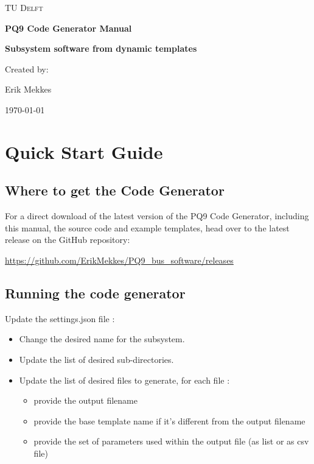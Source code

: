 \documentclass{settings/TU_Delft_Report}
\begin{document}
\begin{titlepage}
	\centering
	{\scshape\LARGE TU Delft \par}
	\vspace{1cm}
	{\huge\bfseries PQ9 Code Generator Manual\par}
	{\Large\bfseries Subsystem software from dynamic templates \par}

	\vfill  %
	{Created by: \par
	    Erik Mekkes}
	
	\vspace{0.3cm}
	
	{\large \today\par} %
\end{titlepage}

\tableofcontents


\chapter{Quick Start Guide}

\section{Where to get the Code Generator}
For a direct download of the latest version of the PQ9 Code Generator, including this manual, the source code and example templates, head over to the latest release on the GitHub repository:\vsp


\url{https://github.com/ErikMekkes/PQ9_bus_software/releases}

\section{Running the code generator}
Update the settings.json file :
\begin{itemize}
\item Change the desired name for the subsystem.
\item Update the list of desired sub-directories.
\item Update the list of desired files to generate, for each file :
\begin{itemize}
    \item provide the output filename
    \item provide the base template name if it's different from the output filename
    \item provide the set of parameters used within the output file (as list or as csv file)
\end{itemize}
\end{itemize}
\end{document}
